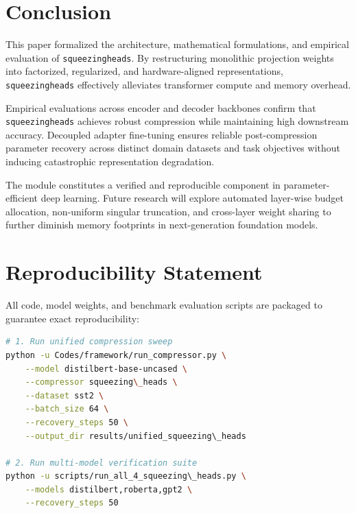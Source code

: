 \section{Conclusion}
This paper formalized the architecture, mathematical formulations, and empirical evaluation of \texttt{squeezingheads}. By restructuring monolithic projection weights into factorized, regularized, and hardware-aligned representations, \texttt{squeezingheads} effectively alleviates transformer compute and memory overhead.

Empirical evaluations across encoder and decoder backbones confirm that \texttt{squeezingheads} achieves robust compression while maintaining high downstream accuracy. Decoupled adapter fine-tuning ensures reliable post-compression parameter recovery across distinct domain datasets and task objectives without inducing catastrophic representation degradation.

The module constitutes a verified and reproducible component in parameter-efficient deep learning. Future research will explore automated layer-wise budget allocation, non-uniform singular truncation, and cross-layer weight sharing to further diminish memory footprints in next-generation foundation models.


\section{Reproducibility Statement}
All code, model weights, and benchmark evaluation scripts are packaged to guarantee exact reproducibility:
\begin{lstlisting}[language=bash]
# 1. Run unified compression sweep
python -u Codes/framework/run_compressor.py \
    --model distilbert-base-uncased \
    --compressor squeezing\_heads \
    --dataset sst2 \
    --batch_size 64 \
    --recovery_steps 50 \
    --output_dir results/unified_squeezing\_heads

# 2. Run multi-model verification suite
python -u scripts/run_all_4_squeezing\_heads.py \
    --models distilbert,roberta,gpt2 \
    --recovery_steps 50
\end{lstlisting}


